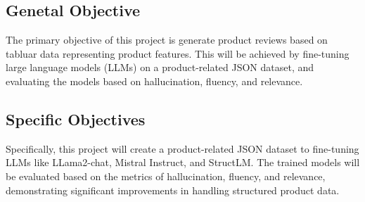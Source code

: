 \subsection*{Genetal Objective}
The primary objective of this project is generate product reviews based on tabluar data representing product features. This will be achieved by fine-tuning large language models (LLMs) on a product-related JSON dataset, and evaluating the models based on hallucination, fluency, and relevance.
\subsection*{Specific Objectives}
Specifically, this project will create a product-related JSON dataset to fine-tuning LLMs like LLama2-chat, Mistral Instruct, and StructLM. The trained models will be evaluated based on the metrics of hallucination, fluency, and relevance, demonstrating significant improvements in handling structured product data.